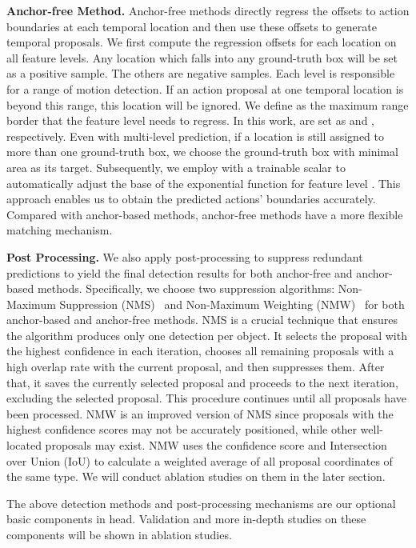 \documentclass[a4paper,fleqn]{cas-dc}
\begin{document}
\textbf{Anchor-free Method.}
Anchor-free methods directly regress the offsets to action boundaries at each temporal location and then use these offsets to generate temporal proposals. We first compute the regression offsets for each location on all feature levels.
Any location which falls into any ground-truth box will be set as a positive sample. The others are negative samples.
Each level is responsible for a range of motion detection.
If an action proposal at one temporal location is beyond this range, this location will be ignored. We define  as the maximum range border that the feature level  needs to regress. In this work,  are set as  and , respectively. Even with multi-level prediction, if a location is still assigned to more than one ground-truth box, we choose the ground-truth box with minimal area as its target. Subsequently, we employ  with a trainable scalar  to automatically adjust the base of the exponential function for feature level . This approach enables us to obtain the predicted actions' boundaries accurately. Compared with anchor-based methods, anchor-free methods have a more flexible matching mechanism. 

\textbf{Post Processing.}
We also apply post-processing to suppress redundant predictions to yield the final detection results for both anchor-free and anchor-based methods. Specifically, we choose two suppression algorithms: Non-Maximum Suppression (NMS)~\citep{nms} and Non-Maximum Weighting (NMW)~\citep{nmw} for both anchor-based and anchor-free methods. NMS is a crucial technique that ensures the algorithm produces only one detection per object. It selects the proposal with the highest confidence in each iteration, chooses all remaining proposals with a high overlap rate with the current proposal, and then suppresses them. After that, it saves the currently selected proposal and proceeds to the next iteration, excluding the selected proposal. This procedure continues until all proposals have been processed. NMW is an improved version of NMS since proposals with the highest confidence scores may not be accurately positioned, while other well-located proposals may exist. NMW uses the confidence score and Intersection over Union (IoU) to calculate a weighted average of all proposal coordinates of the same type. We will conduct ablation studies on them in the later section.


The above detection methods and post-processing mechanisms are our optional basic components in head.
Validation and more in-depth studies on these components will be shown in ablation studies.
\end{document}
